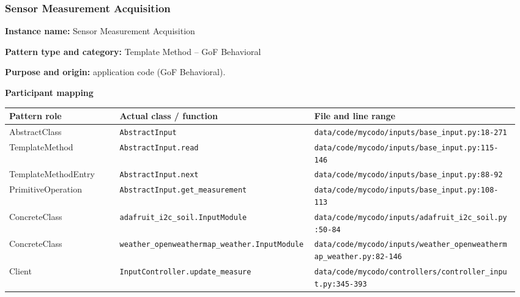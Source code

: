 \documentclass[11pt,a4paper]{article}
\newcommand{\field}[2]{\textbf{#1:} #2\par}
\begin{document}
\subsubsection{Sensor Measurement Acquisition}
\field{Instance name}{Sensor Measurement Acquisition}
\field{Pattern type and category}{Template Method -- GoF Behavioral}
\field{Purpose and origin}{application code (GoF Behavioral).}
\textbf{Participant mapping}\par
{\small\setlength{\tabcolsep}{3pt}
\begin{longtable}{@{}P{0.21\linewidth}P{0.37\linewidth}P{0.39\linewidth}@{}}\toprule
\textbf{Pattern role} & \textbf{Actual class / function} & \textbf{File and line range} \\ \midrule\endhead
AbstractClass & \texttt{AbstractInput} & \texttt{data/\allowbreak{}code/\allowbreak{}mycodo/\allowbreak{}inputs/\allowbreak{}base\_\allowbreak{}input.\allowbreak{}py:18-271} \\
TemplateMethod & \texttt{AbstractInput.\allowbreak{}read} & \texttt{data/\allowbreak{}code/\allowbreak{}mycodo/\allowbreak{}inputs/\allowbreak{}base\_\allowbreak{}input.\allowbreak{}py:115-146} \\
TemplateMethodEntry & \texttt{AbstractInput.\allowbreak{}next} & \texttt{data/\allowbreak{}code/\allowbreak{}mycodo/\allowbreak{}inputs/\allowbreak{}base\_\allowbreak{}input.\allowbreak{}py:88-92} \\
PrimitiveOperation & \texttt{AbstractInput.\allowbreak{}get\_\allowbreak{}measurement} & \texttt{data/\allowbreak{}code/\allowbreak{}mycodo/\allowbreak{}inputs/\allowbreak{}base\_\allowbreak{}input.\allowbreak{}py:108-113} \\
ConcreteClass & \texttt{adafruit\_\allowbreak{}i2c\_\allowbreak{}soil.\allowbreak{}InputModule} & \texttt{data/\allowbreak{}code/\allowbreak{}mycodo/\allowbreak{}inputs/\allowbreak{}adafruit\_\allowbreak{}i2c\_\allowbreak{}soil.\allowbreak{}py:50-84} \\
ConcreteClass & \texttt{weather\_\allowbreak{}openweathermap\_\allowbreak{}weather.\allowbreak{}InputModule} & \texttt{data/\allowbreak{}code/\allowbreak{}mycodo/\allowbreak{}inputs/\allowbreak{}weather\_\allowbreak{}openweathermap\_\allowbreak{}weather.\allowbreak{}py:82-146} \\
Client & \texttt{InputController.\allowbreak{}update\_\allowbreak{}measure} & \texttt{data/\allowbreak{}code/\allowbreak{}mycodo/\allowbreak{}controllers/\allowbreak{}controller\_\allowbreak{}input.\allowbreak{}py:345-393} \\
\bottomrule\end{longtable}}
\end{document}
